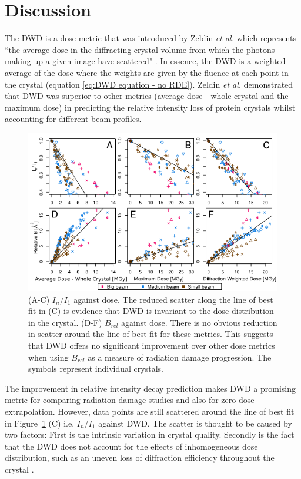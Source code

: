 \section{Discussion}
\label{sec:Discussion}
The DWD is a dose metric that was introduced by Zeldin \textit{et al.} which represents ``the average dose in the diffracting crystal volume from which the photons making up a given image have scattered" \cite{zeldin2013dwd}.
In essence, the DWD is a weighted average of the dose where the weights are given by the fluence at each point in the crystal (equation \ref{eq:DWD equation - no RDE}).
Zeldin \textit{et al.} demonstrated that DWD was superior to other metrics (average dose - whole crystal and the maximum dose) in predicting the relative intensity loss of protein crystals whilst accounting for different beam profiles.
\begin{figure}
  \centering
    \includegraphics[width=1\textwidth]{figures/dwd/zeldin_metric_comparisons.png}
    \caption{(A-C) $I_n/I_1$ against dose. The reduced scatter along the line of best fit in (C) is evidence that DWD is invariant to the dose distribution in the crystal. (D-F) $B_{rel}$ against dose. There is no obvious reduction in scatter around the line of best fit for these metrics. This suggests that DWD offers no significant improvement over other dose metrics when using $B_{rel}$ as a measure of radiation damage progression. The symbols represent individual crystals.}
    \label{fig:Dose metric comparisons - zeldin et al}
\end{figure}
The improvement in relative intensity decay prediction makes DWD a promising metric for comparing radiation damage studies and also for zero dose extrapolation.
However, data points are still scattered around the line of best fit in Figure~\ref{fig:Dose metric comparisons - zeldin et al} (C) i.e. $I_n/I_1$ against DWD.
The scatter is thought to be caused by two factors:
First is the intrinsic variation in crystal quality.
Secondly is the fact that the DWD does not account for the effects of inhomogeneous dose distribution, such as an uneven loss of diffraction efficiency throughout the crystal \cite{zeldin2013dwd}.

